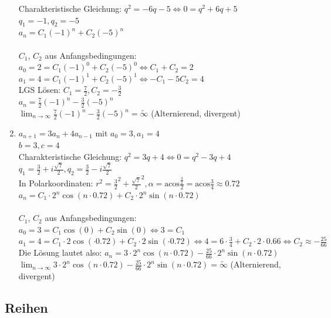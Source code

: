 \documentclass[11pt, a4paper]{article}
\newcommand{\acos}{\mathrm{acos}}
\begin{document}
\begin{enumerate}
		Charakteristische Gleichung: $q^2 = -6q -5 \Leftrightarrow 0 = q^2 + 6q + 5$ \\
		$q_1=-1, q_2=-5$ \\
		$a_n = C_1 (-1)^n + C_2 (-5)^n$ \\ \\
		$C_1$, $C_2$ aus Anfangsbedingungen: \\
		$a_0 = 2 = C_1 (-1)^0 + C_2 (-5)^0 \Leftrightarrow C_1 + C_2 = 2$ \\
		$a_1 = 4 = C_1 (-1)^1 + C_2 (-5)^1 \Leftrightarrow -C_1 -5C_2 = 4$ \\
		LGS Lösen: $C_1=\frac{7}{2}, C_2=-\frac{3}{2}$ \\
		$a_n = \frac{7}{2} (-1)^n - \frac{3}{2} (-5)^n$ \\
		$\lim_{n \rightarrow \infty} \frac{7}{2} (-1)^n - \frac{3}{2} (-5)^n = \tilde{\infty}$ (Alternierend, divergent)
	\item $a_{n+1} = 3 a_n + 4 a_{n-1}$ mit $a_0=3, a_1=4$ \\
		$b=3, c=4$ \\
		Charakteristische Gleichung: $q^2 = 3q + 4 \Leftrightarrow 0 = q^2 - 3q + 4$ \\
		$q_1=\frac{3}{2} + i \frac{\sqrt{7}}{2}, q_2=\frac{3}{2} - i \frac{\sqrt{7}}{2}$ \\
		In Polarkoordinaten: $r^2 = \frac{3}{2}^2 + \frac{\sqrt{7}}{2}^2, \alpha = \acos \frac{\frac{3}{2}}{2} = \acos \frac{3}{4} \approx 0.72$ \\
		$a_n = C_1 \cdot 2^n \cos(n\cdot 0.72) + C_2 \cdot 2^n \sin(n \cdot 0.72)$ \\ \\
		$C_1$, $C_2$ aus Anfangsbedingungen: \\
		$a_0 = 3 = C_1 \cos(0) + C_2 \sin(0) \Leftrightarrow 3 = C_1$ \\
		$a_1 = 4 = C_1 \cdot 2 \cos(\cdot 0.72) + C_2 \cdot 2 \sin(\cdot 0.72) \Leftrightarrow 4 = 6 \cdot \frac{3}{4} + C_2 \cdot 2 \cdot 0.66 \Leftrightarrow C_2 \approx -\frac{25}{66}$ \\
		Die Lösung lautet also: $a_n = 3 \cdot 2^n \cos(n\cdot 0.72) -\frac{25}{66} \cdot 2^n \sin(n \cdot 0.72)$ \\
		$\lim_{n \rightarrow \infty} 3 \cdot 2^n \cos(n\cdot 0.72) -\frac{25}{66} \cdot 2^n \sin(n \cdot 0.72) = \tilde{\infty}$ (Alternierend, divergent)
\end{enumerate}

\subsection{Reihen}
\end{document}

